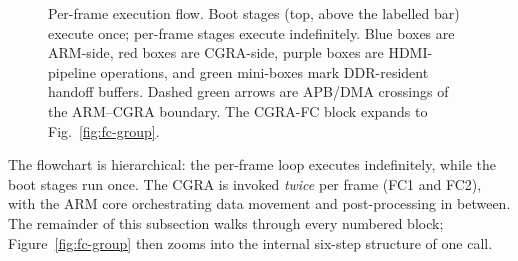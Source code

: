 \begin{figure}[!htbp]
{%
}
\caption{Per-frame execution flow. Boot stages (top, above the labelled
bar) execute once; per-frame stages execute indefinitely. Blue
boxes are ARM-side, red boxes are CGRA-side, purple boxes are
HDMI-pipeline operations, and green mini-boxes mark DDR-resident handoff
buffers. Dashed green arrows are APB/DMA crossings of the ARM--CGRA
boundary. The CGRA-FC block expands to Fig.~\ref{fig:fc-group}.}
\label{fig:swimlane}
\end{figure}

The flowchart is hierarchical: the per-frame loop executes
indefinitely, while the boot stages run once. The CGRA is invoked
\emph{twice} per frame (FC1 and FC2), with the ARM core orchestrating
data movement and post-processing in between. The remainder of this
subsection walks through every numbered block; Figure~\ref{fig:fc-group}
then zooms into the internal six-step structure of one
 call.

